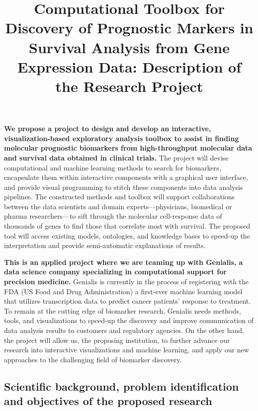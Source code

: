 \documentclass[11pt,a4paper]{article}
\renewcommand{\bold}{\textbf}
\begin{document}
\title{\Large Computational Toolbox for Discovery of Prognostic Markers in Survival Analysis from Gene Expression Data: Description of the Research Project}
\author{}
\date{}
\maketitle
\vspace*{-1cm}

\bold{We propose a project to design and develop an interactive, visualization-based exploratory analysis toolbox to assist in finding molecular prognostic biomarkers from high-throughput molecular data and survival data obtained in clinical trials.} The project will devise computational and machine learning methods to search for biomarkers, encapsulate them within interactive components with a graphical user interface, and provide visual programming to stitch these components into data analysis pipelines. The constructed methods and toolbox will support collaborations between the data scientists and domain experts---physicians, biomedical or pharma researchers---to sift through the molecular cell-response data of thousands of genes to find those that correlate most with survival. The proposed tool will access existing models, ontologies, and knowledge bases to speed-up the interpretation and provide semi-automatic explanations of results.

\bold{This is an applied project where we are teaming up with Genialis, a data science company specializing in computational support for precision medicine.} Genialis is currently in the process of registering with the FDA (US Food and Drug Administration) a first-ever machine learning model that utilizes transcription data to predict cancer patients' response to treatment. To remain at the cutting edge of biomarker research, Genialis needs methods, tools, and visualizations to speed-up the discovery and improve communication of data analysis results to customers and regulatory agencies. On the other hand, the project will allow us, the proposing institution, to further advance our research into interactive visualizations and machine learning, and apply our new approaches to the challenging field of biomarker discovery.

\subsection{Scientific background, problem identification and objectives of the proposed research}
\end{document}
